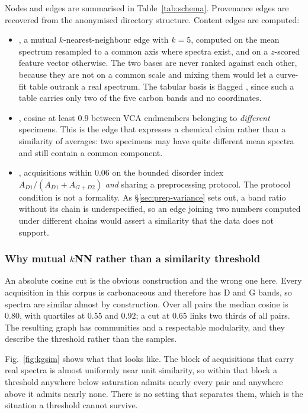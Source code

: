 Nodes and edges are summarised in Table~\ref{tab:schema}. Provenance edges are
recovered from the anonymised directory structure. Content edges are computed:

\begin{itemize}\itemsep2pt
\item {}, a mutual $k$-nearest-neighbour edge with $k=5$,
computed on the mean spectrum resampled to a common axis where spectra exist,
and on a $z$-scored feature vector otherwise. The two bases are never ranked
against each other, because they are not on a common scale and mixing them
would let a curve-fit table outrank a real spectrum. The tabular basis is
flagged , since such a table carries only two of the five
carbon bands and no coordinates.
\item {}, cosine at least $0.9$ between VCA endmembers
\cite{nascimento2005vca} belonging to \emph{different} specimens. This is the
edge that expresses a chemical claim rather than a similarity of averages: two
specimens may have quite different mean spectra and still contain a common
component.
\item {}, acquisitions within $0.06$ on the bounded
disorder index $A_{D1}/(A_{D1}+A_{G+D2})$ \emph{and} sharing a preprocessing
protocol. The protocol condition is not a formality. As
\S\ref{sec:prep-variance} sets out, a band ratio without its chain is
underspecified, so an edge joining two numbers computed under different chains
would assert a similarity that the data does not support.
\end{itemize}

\subsubsection{Why mutual $k$NN rather than a similarity threshold}

An absolute cosine cut is the obvious construction and the wrong one here.
Every acquisition in this corpus is carbonaceous and therefore has D and G
bands, so spectra are similar almost by construction. Over all pairs the median
cosine is $0.80$, with quartiles at $0.55$ and $0.92$; a cut at $0.65$ links
two thirds of all pairs. The resulting graph has communities and a respectable
modularity, and they describe the threshold rather than the samples.

Fig.~\ref{fig:kgsim} shows what that looks like. The block of acquisitions
that carry real spectra is almost uniformly near unit similarity, so within
that block a threshold anywhere below saturation admits nearly every pair and
anywhere above it admits nearly none. There is no setting that separates them,
which is the situation a threshold cannot survive.

